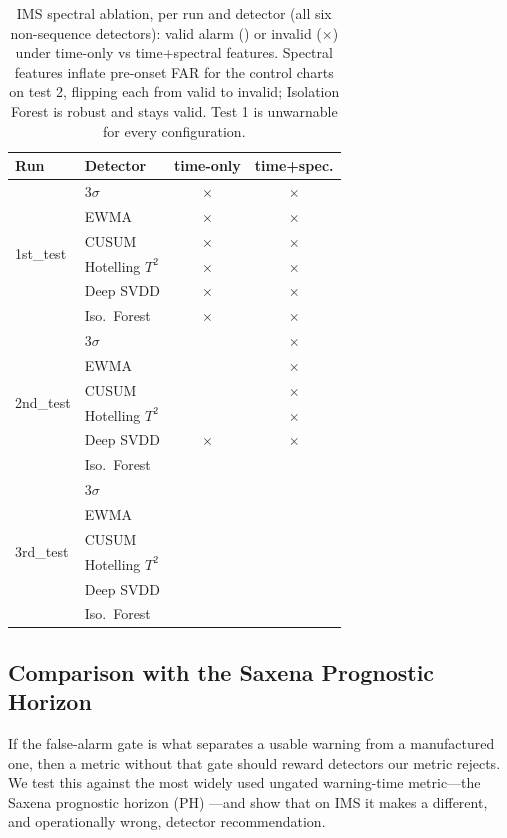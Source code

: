 \documentclass[IJPHM, 2026, 0]{PHMSociety}
\begin{document}
\begin{table}[t] \small
	\begin{center}
	\caption{IMS spectral ablation, per run and detector (all six non-sequence detectors): valid alarm (\checkmark) or invalid ($\times$) under time-only vs time+spectral features. Spectral features inflate pre-onset FAR for the control charts on test 2, flipping each from valid to invalid; Isolation Forest is robust and stays valid. Test 1 is unwarnable for every configuration.}
	\label{tab:spectral}
	\begin{tabular}{l l c c}
		\hline \hline
		\textbf{Run} & \textbf{Detector} & \textbf{time-only} & \textbf{time+spec.} \\
		\hline
		\multirow{6}{*}{1st\_test} & $3\sigma$ & $\times$ & $\times$ \\
		 & EWMA & $\times$ & $\times$ \\
		 & CUSUM & $\times$ & $\times$ \\
		 & Hotelling $T^2$ & $\times$ & $\times$ \\
		 & Deep SVDD & $\times$ & $\times$ \\
		 & Iso.\ Forest & $\times$ & $\times$ \\
		\hline
		\multirow{6}{*}{2nd\_test} & $3\sigma$ & \checkmark & $\times$ \\
		 & EWMA & \checkmark & $\times$ \\
		 & CUSUM & \checkmark & $\times$ \\
		 & Hotelling $T^2$ & \checkmark & $\times$ \\
		 & Deep SVDD & $\times$ & $\times$ \\
		 & Iso.\ Forest & \checkmark & \checkmark \\
		\hline
		\multirow{6}{*}{3rd\_test} & $3\sigma$ & \checkmark & \checkmark \\
		 & EWMA & \checkmark & \checkmark \\
		 & CUSUM & \checkmark & \checkmark \\
		 & Hotelling $T^2$ & \checkmark & \checkmark \\
		 & Deep SVDD & \checkmark & \checkmark \\
		 & Iso.\ Forest & \checkmark & \checkmark \\
		\hline \hline
	\end{tabular}
	\end{center}
\end{table}

\subsection{Comparison with the Saxena Prognostic Horizon}
\label{sec:saxena}
If the false-alarm gate is what separates a usable warning from a manufactured one, then a metric without that gate should reward detectors our metric rejects. We test this against the most widely used ungated warning-time metric---the Saxena prognostic horizon (PH) \cite{saxena2008metrics,saxena2010metrics}---and show that on IMS it makes a different, and operationally wrong, detector recommendation.
\end{document}
